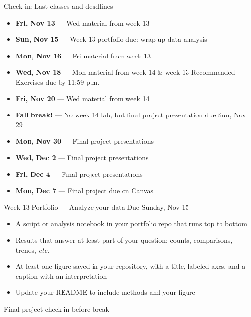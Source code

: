 \documentclass[9pt,aspectratio=169]{beamer}
\begin{document}
\begin{frame}{Check-in: Last classes and deadlines}
    \begin{itemize}
        \item \textbf{Fri, Nov 13} --- Wed material from week 13
        \item \textbf{Sun, Nov 15} --- Week 13 portfolio due: wrap up data analysis
        \medskip
        \item \textbf{Mon, Nov 16} --- Fri material from week 13
        \item \textbf{Wed, Nov 18} --- Mon material from week 14 \& week 13 Recommended Exercises due by 11:59 p.m.
        \item \textbf{Fri, Nov 20} --- Wed material from week 14
        \medskip 
        \item \textbf{Fall break!} --- No week 14 lab, but final project presentation due Sun, Nov 29
        \medskip
        \item \textbf{Mon, Nov 30} --- Final project presentations
        \item \textbf{Wed, Dec 2} --- Final project presentations
        \item \textbf{Fri, Dec 4} --- Final project presentations
        \medskip
        \item \textbf{Mon, Dec 7} --- Final project due on Canvas
    \end{itemize}
\end{frame}

\begin{frame}{Week 13 Portfolio — Analyze your data}
    Due Sunday, Nov 15

    \bigskip
    
    \begin{itemize}\small
        \item A script or analysis notebook in your portfolio repo that runs top to bottom
        \item Results that answer at least part of your question: counts, comparisons, trends, \textit{etc}.
        \item At least one figure saved in your repository, with a title, labeled axes, and a caption with an interpretation
        \item Update your README to include methods and your figure
    \end{itemize}

    \medskip
    Final project check-in before break
\end{frame}
\end{document}
